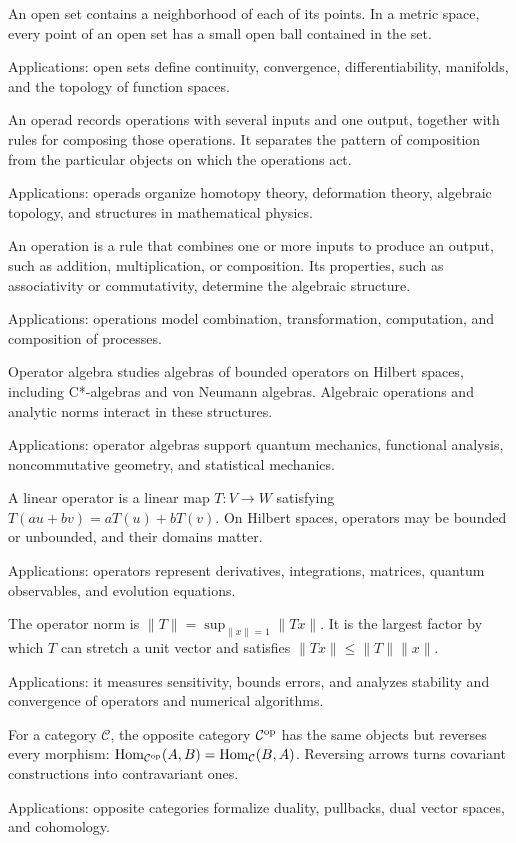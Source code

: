 An open set contains a neighborhood of each of its points. In a metric space, every point of an open set has a small open ball contained in the set. \par\noindent Applications: open sets define continuity, convergence, differentiability, manifolds, and the topology of function spaces.

An operad records operations with several inputs and one output, together with rules for composing those operations. It separates the pattern of composition from the particular objects on which the operations act. \par\noindent Applications: operads organize homotopy theory, deformation theory, algebraic topology, and structures in mathematical physics.

An operation is a rule that combines one or more inputs to produce an output, such as addition, multiplication, or composition. Its properties, such as associativity or commutativity, determine the algebraic structure. \par\noindent Applications: operations model combination, transformation, computation, and composition of processes.

Operator algebra studies algebras of bounded operators on Hilbert spaces, including C*-algebras and von Neumann algebras. Algebraic operations and analytic norms interact in these structures. \par\noindent Applications: operator algebras support quantum mechanics, functional analysis, noncommutative geometry, and statistical mechanics.

A linear operator is a linear map $T:V\to W$ satisfying $T(au+bv)=aT(u)+bT(v)$. On Hilbert spaces, operators may be bounded or unbounded, and their domains matter. \par\noindent Applications: operators represent derivatives, integrations, matrices, quantum observables, and evolution equations.

The operator norm is $\|T\|=\sup_{\|x\|=1}\|Tx\|$. It is the largest factor by which $T$ can stretch a unit vector and satisfies $\|Tx\|\leq\|T\|\|x\|$. \par\noindent Applications: it measures sensitivity, bounds errors, and analyzes stability and convergence of operators and numerical algorithms.

For a category $\mathcal C$, the opposite category $\mathcal C^{\rm op}$ has the same objects but reverses every morphism: $\operatorname{Hom}_{\mathcal C^{\rm op}}(A,B)=\operatorname{Hom}_{\mathcal C}(B,A)$. Reversing arrows turns covariant constructions into contravariant ones. \par\noindent Applications: opposite categories formalize duality, pullbacks, dual vector spaces, and cohomology.

